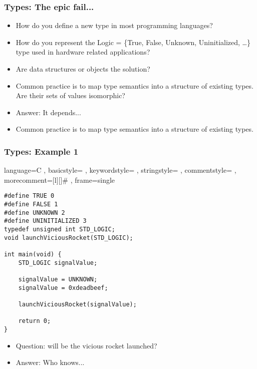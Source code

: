\documentclass[11pt]{beamer}
\begin{document}
	\begin{frame}
		\frametitle{Types: The epic fail...}
			\begin{itemize}[<+->]
				\item How do you define a new type in most programming languages?
				\item How do you represent the Logic = \{True, False, Unknown, Uninitialized, \ldots \} type used in hardware related applications?
				\item Are data structures or objects the solution?
				\item Common practice is to map type semantics into a structure of existing types. Are their sets of values isomorphic?
				\item Answer: It depends...
				\item Common practice is to map type semantics into a structure of existing types.
			\end{itemize}
	\end{frame}

\begin{frame}[fragile]
\frametitle{Types: Example 1}

\lstset
	{ language=C
	, basicstyle=\ttfamily\footnotesize
	, keywordstyle=\color{blue}\ttfamily
	, stringstyle=\color{red}\ttfamily
	, commentstyle=\color{green}\ttfamily
	, morecomment=[l][\color{magenta}]{\#}
	, frame=single
}

\begin{lstlisting}
#define TRUE 0
#define FALSE 1
#define UNKNOWN 2
#define UNINITIALIZED 3
typedef unsigned int STD_LOGIC;
void launchViciousRocket(STD_LOGIC);

int main(void) {
	STD_LOGIC signalValue;

	signalValue = UNKNOWN;
	signalValue = 0xdeadbeef;

	launchViciousRocket(signalValue);
	
	return 0;
}
\end{lstlisting}

\begin{itemize}[<+->]
	\item Question: will be the vicious rocket launched?
	\item Answer: Who knows...
\end{itemize}
\end{frame}
\end{document}
